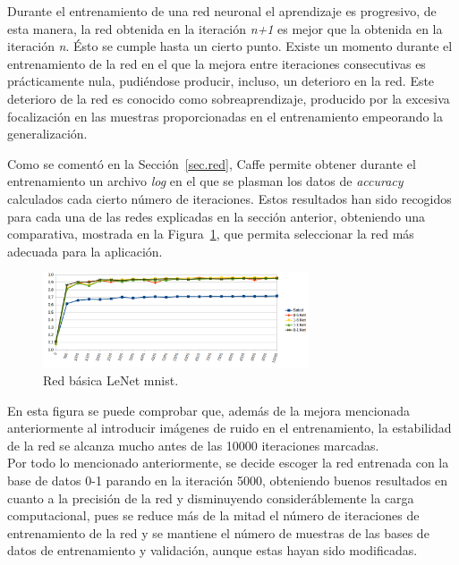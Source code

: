 Durante el entrenamiento de una red neuronal el aprendizaje es progresivo, de esta manera, la red obtenida en la iteración \textit{n+1} es mejor que la obtenida en la iteración \textit{n}. Ésto se cumple hasta un cierto punto. Existe un momento durante el entrenamiento de la red en el que la mejora entre iteraciones consecutivas es prácticamente nula, pudiéndose producir, incluso, un deterioro en la red. Este deterioro de la red es conocido como sobreaprendizaje, producido por la excesiva focalización en las muestras proporcionadas en el entrenamiento empeorando la generalización.\\
\vspace{10pt}

Como se comentó en la Sección~\ref{sec.red}, Caffe permite obtener durante el entrenamiento un archivo \textit{log} en el que se plasman los datos de \textit{accuracy} calculados cada cierto número de iteraciones. Estos resultados han sido recogidos para cada una de las redes explicadas en la sección anterior, obteniendo una comparativa, mostrada en la Figura~\ref{fig.iteraciones}, que permita seleccionar la red más adecuada para la aplicación.
\begin{figure}[H]
	\begin{center}
		\includegraphics[width=0.7\textwidth]{figures/iteraciones}
		\caption{Red básica LeNet \acrshort{mnist}.}
		\label{fig.iteraciones}
	\end{center}
\end{figure}
En esta figura se puede comprobar que, además de la mejora mencionada anteriormente al introducir imágenes de ruido en el entrenamiento, la estabilidad de la red se alcanza mucho antes de las 10000 iteraciones marcadas.\\

Por todo lo mencionado anteriormente, se decide escoger la red entrenada con la base de datos 0-1 parando en la iteración 5000, obteniendo buenos resultados en cuanto a la precisión de la red y disminuyendo consideráblemente la carga computacional, pues se reduce más de la mitad el número de iteraciones de entrenamiento de la red y se mantiene el número de muestras de las bases de datos de entrenamiento y validación, aunque estas hayan sido modificadas.

